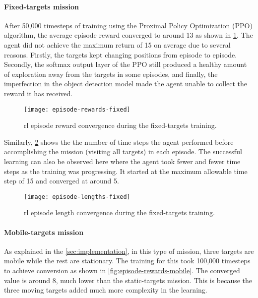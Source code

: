 \documentclass[../main.tex]{subfiles}
\begin{document}
\paragraph{Fixed-targets mission}

After 50,000 timesteps of training using the Proximal Policy
Optimization (PPO) algorithm, the average episode reward converged
to around 13 as shown in \cref{fig:episode-rewards-fixed}.
The agent did not achieve the maximum return of 15
on average
due to several reasons. Firstly, the
targets kept changing positions from episode to episode.
Secondly, the softmax output layer of the PPO still produced 
a healthy amount
of exploration away from the targets in some episodes,
and finally, the imperfection in the object detection model made
the agent unable to collect the reward it has received. 

\begin{figure}[!t]
	\centering
	\texttt{[image: episode-rewards-fixed]}
        \caption{\gls{rl} episode reward convergence during the
        fixed-targets training.}
        \label{fig:episode-rewards-fixed}
\end{figure}

Similarly, \cref{fig:episode-lengths-fixed} shows the the number of
time steps the agent performed before accomplishing the mission
(visiting all targets) in each episode.
The successful learning can also be observed here where the agent took
fewer and fewer time steps as the training was progressing.
It started at the maximum allowable time step of 15 and converged at
around 5.

\begin{figure}[!t]
	\centering
	\texttt{[image: episode-lengths-fixed]}
        \caption{\gls{rl} episode length convergence during the
        fixed-targets training.}
        \label{fig:episode-lengths-fixed}
\end{figure}

\paragraph{Mobile-targets mission}

As explained in the \cref{sec:implementation}, in this type of
mission, three targets are mobile while the rest are stationary.
The training for this took 100,000 timesteps to achieve conversion as
shown in \cref{fig:episode-rewards-mobile}.
The converged value is around 8, much lower than the static-targets
mission.
This is because the three moving targets added much more complexity in the
learning.
\end{document}
